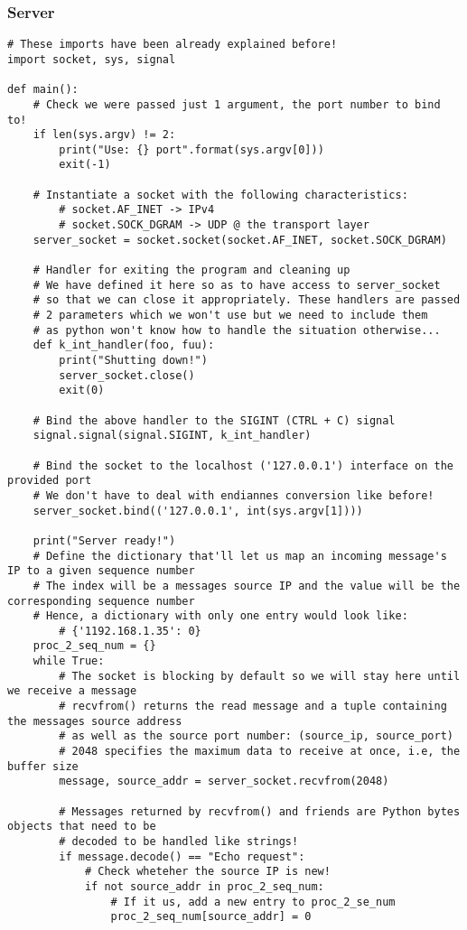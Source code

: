 \documentclass[landscape]{article}
\begin{document}
            \subsubsection{Server}
                \begin{verbatim}
# These imports have been already explained before!
import socket, sys, signal

def main():
    # Check we were passed just 1 argument, the port number to bind to!
    if len(sys.argv) != 2:
        print("Use: {} port".format(sys.argv[0]))
        exit(-1)

    # Instantiate a socket with the following characteristics:
        # socket.AF_INET -> IPv4
        # socket.SOCK_DGRAM -> UDP @ the transport layer
    server_socket = socket.socket(socket.AF_INET, socket.SOCK_DGRAM)

    # Handler for exiting the program and cleaning up
    # We have defined it here so as to have access to server_socket
    # so that we can close it appropriately. These handlers are passed
    # 2 parameters which we won't use but we need to include them
    # as python won't know how to handle the situation otherwise...
    def k_int_handler(foo, fuu):
        print("Shutting down!")
        server_socket.close()
        exit(0)

    # Bind the above handler to the SIGINT (CTRL + C) signal
    signal.signal(signal.SIGINT, k_int_handler)

    # Bind the socket to the localhost ('127.0.0.1') interface on the provided port
    # We don't have to deal with endiannes conversion like before!
    server_socket.bind(('127.0.0.1', int(sys.argv[1])))

    print("Server ready!")
    # Define the dictionary that'll let us map an incoming message's IP to a given sequence number
    # The index will be a messages source IP and the value will be the corresponding sequence number
    # Hence, a dictionary with only one entry would look like:
        # {'1192.168.1.35': 0}
    proc_2_seq_num = {}
    while True:
        # The socket is blocking by default so we will stay here until we receive a message
        # recvfrom() returns the read message and a tuple containing the messages source address
        # as well as the source port number: (source_ip, source_port)
        # 2048 specifies the maximum data to receive at once, i.e, the buffer size
        message, source_addr = server_socket.recvfrom(2048)

        # Messages returned by recvfrom() and friends are Python bytes objects that need to be
        # decoded to be handled like strings!
        if message.decode() == "Echo request":
            # Check wheteher the source IP is new!
            if not source_addr in proc_2_seq_num:
                # If it us, add a new entry to proc_2_se_num
                proc_2_seq_num[source_addr] = 0


\end{verbatim}
\end{document}
